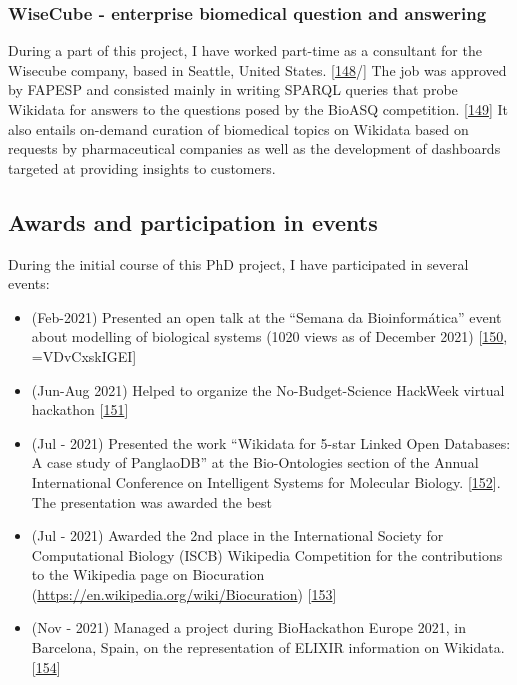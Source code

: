 \hypertarget{wisecube---enterprise-biomedical-question-and-answering}{%
\subsubsection{WiseCube - enterprise biomedical question and answering}\label{wisecube---enterprise-biomedical-question-and-answering}}

During a part of this project, I have worked part-time as a consultant for the Wisecube company, based in Seattle, United States. {[}\protect\hyperlink{ref-gdYsBE7d}{148}/{]}
The job was approved by FAPESP and consisted mainly in writing SPARQL queries that probe Wikidata for answers to the questions posed by the BioASQ competition. {[}\protect\hyperlink{ref-rkXotO9x}{149}{]}
It also entails on-demand curation of biomedical topics on Wikidata based on requests by pharmaceutical companies as well as the development of dashboards targeted at providing insights to customers.

\hypertarget{awards-and-participation-in-events}{%
\subsection{Awards and participation in events}\label{awards-and-participation-in-events}}

During the initial course of this PhD project, I have participated in several events:

\begin{itemize}
\tightlist
\item
  (Feb-2021) Presented an open talk at the ``Semana da Bioinformática'' event about modelling of biological systems (1020 views as of December 2021) {[}\protect\hyperlink{ref-1C9uHr1Zk}{150}, =VDvCxskIGEI{]}
\item
  (Jun-Aug 2021) Helped to organize the No-Budget-Science HackWeek virtual hackathon {[}\protect\hyperlink{ref-12LOzmXRs}{151}{]}
\item
  (Jul - 2021) Presented the work ``Wikidata for 5-star Linked Open Databases: A case study of PanglaoDB'' at the Bio-Ontologies section of the Annual International Conference on Intelligent Systems for Molecular Biology. {[}\protect\hyperlink{ref-SALI6Ywb}{152}{]}. The presentation was awarded the best
\item
  (Jul - 2021) Awarded the 2nd place in the International Society for Computational Biology (ISCB) Wikipedia Competition for the contributions to the Wikipedia page on Biocuration (\url{https://en.wikipedia.org/wiki/Biocuration}) {[}\protect\hyperlink{ref-IJG65hFm}{153}{]}
\item
  (Nov - 2021) Managed a project during BioHackathon Europe 2021, in Barcelona, Spain, on the representation of ELIXIR information on Wikidata. {[}\protect\hyperlink{ref-14Wi842eZ}{154}{]}
\end{itemize}

